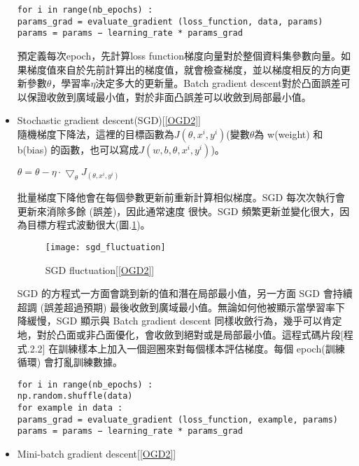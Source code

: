 \begin{itemize}
\begin{lstlisting}[caption=\Large Batch gradient descrnt]
 for i in range(nb_epochs) :
params_grad = evaluate_gradient (loss_function, data, params)
params = params − learning_rate * params_grad
\end{lstlisting}
\newpage
 預定義每次epoch，先計算loss function梯度向量對於整個資料集參數向量。如果梯度值來自於先前計算出的梯度值，就會檢查梯度，並以梯度相反的方向更新參數$\theta$，學習率$\eta$決定多大的更新量。Batch gradient descent對於凸面誤差可以保證收斂到廣域最小值，對於非面凸誤差可以收斂到局部最小值。
\item Stochastic gradient descent(SGD)[\ref{OGD2}]\\
隨機梯度下降法，這裡的目標函數為$J(\theta, x^i, y^i)$(變數$\theta$為 w(weight) 和 b(bias) 的函數，也可以寫成$J(w,b,\theta, x^i, y^i)$)。\\
\begin{center}
$\theta=\theta-\eta\cdot\bigtriangledown_{\theta}J_{(\theta, x^i, y^i)}$
\end{center}
批量梯度下降他會在每個參數更新前重新計算相似梯度。SGD 每次次執行會更新來消除多餘 (誤差)，因此通常速度 很快。SGD 頻繁更新並變化很大，因為目標方程式波動很大(圖.\ref{sgd_fluctuation})。\\

\begin{figure}
\begin{center}
\texttt{[image: sgd\_fluctuation]}
\caption{\Large SGD fluctuation[\ref{OGD2}]}
\label{sgd_fluctuation}
\end{center}
\end{figure}
 SGD 的方程式一方面會跳到新的值和潛在局部最小值，另一方面 SGD 會持續超調 (誤差超過預期) 最後收斂到廣域最小值。無論如何他被顯示當學習率下降緩慢，SGD 顯示與 Batch gradient descent 同樣收斂行為，幾乎可以肯定地，對於凸面或非凸面優化，會收斂到絕對或是局部最小值。這程式碼片段[程式.2.2] 在訓練樣本上加入一個迴圈來對每個樣本評估梯度。每個 epoch(訓練循環) 會打亂訓練數據。
\label{code Stochastic gradient descrnt code}
\begin{lstlisting}[caption=\Large Stochastic gradient descrnt ]
for i in range(nb_epochs) :
np.random.shuffle(data)
for example in data :
params_grad = evaluate_gradient (loss_function, example, params)
params = params − learning_rate * params_grad
\end{lstlisting}
\item Mini-batch gradient descent[\ref{OGD2}]


\end{itemize}
